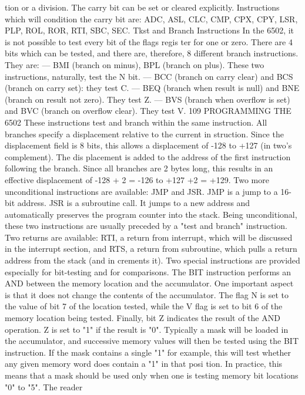 tion or a division. The carry bit can be set or cleared explicitly.
Instructions which will condition the carry bit are: ADC, ASL,
CLC, CMP, CPX, CPY, LSR, PLP, ROL, ROR, RTI, SBC, SEC.
Tkst and Branch Instructions
In the 6502, it is not possible to test every bit of the flags regis
ter for one or zero. There are 4 bits which can be tested, and there are,
therefore, 8 different branch instructions. They are:
— BMI (branch on minus), BPL (branch on plus). These two
instructions, naturally, test the N bit.
— BCC (branch on carry clear) and BCS (branch on carry set):
they test C.
— BEQ (branch when result is null) and BNE (branch on
result not zero). They test Z.
— BVS (branch when overflow is set) and BVC (branch on
overflow clear). They test V.
109
PROGRAMMING THE 6502
These instructions test and branch within the same instruction.
All branches specify a displacement relative to the current in
struction. Since the displacement field is 8 bits, this allows a
displacement of -128 to +127 (in two's complement). The dis
placement is added to the address of the first instruction following
the branch.
Since all branches are 2 bytes long, this results in an effective
displacement of -128 + 2 = -126 to +127 +2 = +129.
Two more unconditional instructions are available: JMP and
JSR. JMP is a jump to a 16-bit address. JSR is a subroutine call. It
jumps to a new address and automatically preserves the program
counter into the stack. Being unconditional, these two instructions
are usually preceded by a "test and branch" instruction.
Two returns are available: RTI, a return from interrupt, which
will be discussed in the interrupt section, and RTS, a return from
subroutine, which pulls a return address from the stack (and in
crements it).
Two special instructions are provided especially for bit-testing
and for comparisons.
The BIT instruction performs an AND between the memory
location and the accumulator. One important aspect is that it does
not change the contents of the accumulator. The flag N is set to the
value of bit 7 of the location tested, while the V flag is set to
bit 6 of the memory location being tested. Finally, bit Z indicates
the result of the AND operation. Z is set to "1" if the result is "0".
Typically a mask will be loaded in the accumulator, and successive
memory values will then be tested using the BIT instruction.
If the mask contains a single "1" for example, this will test
whether any given memory word does contain a "1" in that posi
tion. In practice, this means that a mask should be used only
when one is testing memory bit locations "0" to "5". The reader
